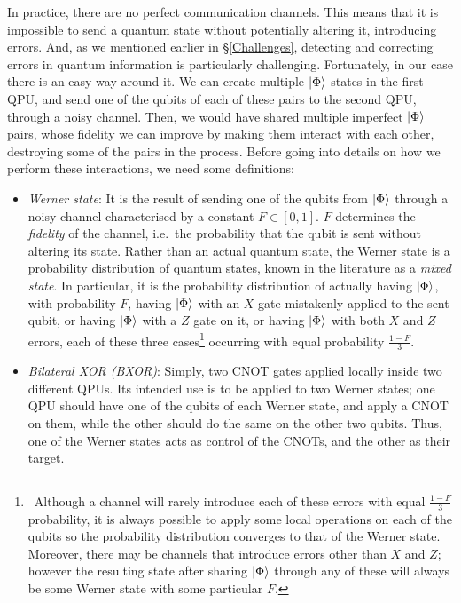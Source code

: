 In practice, there are no perfect communication channels. This means that it is impossible to send a quantum state without potentially altering it, introducing errors. And, as we mentioned earlier in \S\ref{Challenges}, detecting and correcting errors in quantum information is particularly challenging. Fortunately, in our case there is an easy way around it. We can create multiple \(\vert \Phi \rangle\) states in the first QPU, and send one of the qubits of each of these pairs to the second QPU, through a noisy channel. Then, we would have shared multiple imperfect \(\vert \Phi \rangle\) pairs, whose fidelity we can improve by making them interact with each other, destroying some of the pairs in the process. Before going into details on how we perform these interactions, we need some definitions:

\begin{itemize}
  \item \textit{Werner state}: It is the result of sending one of the qubits from \(\vert \Phi \rangle\) through a noisy channel characterised by a constant \(F \in [0,1]\). \(F\) determines the \textit{fidelity} of the channel, i.e.\ the probability that the qubit is sent without altering its state. Rather than an actual quantum state, the Werner state is a probability distribution of quantum states, known in the literature as a \textit{mixed state}. In particular, it is the probability distribution of actually having \(\vert \Phi \rangle\), with probability \(F\), having \(\vert \Phi \rangle\) with an \(X\) gate mistakenly applied to the sent qubit, or having \(\vert \Phi \rangle\) with a \(Z\) gate on it, or having \(\vert \Phi \rangle\) with both \(X\) and \(Z\) errors, each of these three cases\footnote{\, Although a channel will rarely introduce each of these errors with equal \(\frac{1-F}{3}\) probability, it is always possible to apply some local operations on each of the qubits so the probability distribution converges to that of the Werner state. Moreover, there may be channels that introduce errors other than \(X\) and \(Z\); however the resulting state after sharing \(\vert \Phi \rangle\) through any of these will always be some Werner state with some particular \(F\).} occurring with equal probability \(\frac{1-F}{3}\).

  \item \textit{Bilateral XOR (BXOR)}: Simply, two CNOT gates applied locally inside two different QPUs. Its intended use is to be applied to two Werner states; one QPU should have one of the qubits of each Werner state, and apply a CNOT on them, while the other should do the same on the other two qubits. Thus, one of the Werner states acts as control of the CNOTs, and the other as their target.
\end{itemize}

